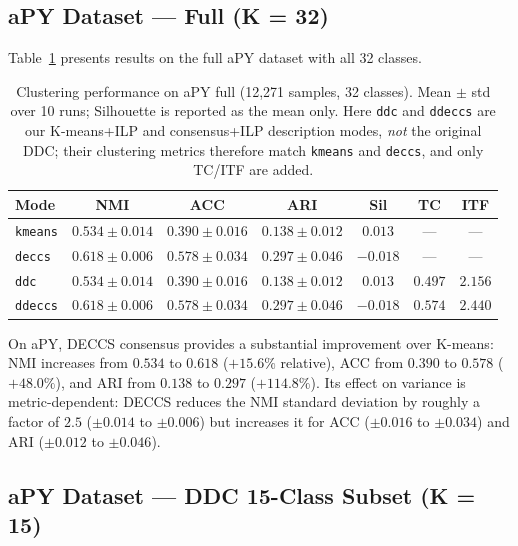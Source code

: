 \subsection{aPY Dataset --- Full (K = 32)}
\label{subsec:apy_results}

Table~\ref{tab:apy32_results} presents results on the full aPY dataset with all 32 classes.

\begin{table}[H]
    \centering
    \caption{Clustering performance on aPY full (12,271 samples, 32 classes). Mean $\pm$ std over 10 runs; Silhouette is reported as the mean only. Here \texttt{ddc} and \texttt{ddeccs} are our K-means+ILP and consensus+ILP description modes, \emph{not} the original DDC; their clustering metrics therefore match \texttt{kmeans} and \texttt{deccs}, and only TC/ITF are added.}
    \label{tab:apy32_results}
    \begin{tabular}{lcccccc}
        \hline
        \textbf{Mode} & \textbf{NMI} & \textbf{ACC} & \textbf{ARI} & \textbf{Sil} & \textbf{TC} & \textbf{ITF} \\
        \hline
        \texttt{kmeans} & $0.534 \pm 0.014$ & $0.390 \pm 0.016$ & $0.138 \pm 0.012$ & $0.013$ & --- & --- \\
        \texttt{deccs} & $0.618 \pm 0.006$ & $0.578 \pm 0.034$ & $0.297 \pm 0.046$ & $-0.018$ & --- & --- \\
        \texttt{ddc} & $0.534 \pm 0.014$ & $0.390 \pm 0.016$ & $0.138 \pm 0.012$ & $0.013$ & $0.497$ & $2.156$ \\
        \texttt{ddeccs} & $0.618 \pm 0.006$ & $0.578 \pm 0.034$ & $0.297 \pm 0.046$ & $-0.018$ & $0.574$ & $2.440$ \\
        \hline
    \end{tabular}
\end{table}


On aPY, DECCS consensus provides a substantial improvement over K-means: NMI increases from $0.534$ to $0.618$ ($+15.6\%$ relative), ACC from $0.390$ to $0.578$ ($+48.0\%$), and ARI from $0.138$ to $0.297$ ($+114.8\%$). Its effect on variance is metric-dependent: DECCS reduces the NMI standard deviation by roughly a factor of $2.5$ ($\pm 0.014$ to $\pm 0.006$) but increases it for ACC ($\pm 0.016$ to $\pm 0.034$) and ARI ($\pm 0.012$ to $\pm 0.046$).

\subsection{aPY Dataset --- DDC 15-Class Subset (K = 15)}
\label{sec:apy15}


